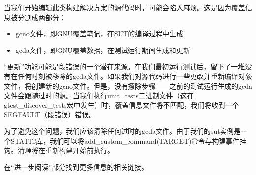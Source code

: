 当我们开始编辑此类构建解决方案的源代码时，可能会陷入麻烦。这是因为覆盖信息被分割成两部分：

\begin{itemize}
\item
gcno文件，即GNU覆盖笔记，在SUT的编译过程中生成

\item
gcda文件，即GNU覆盖数据，在测试运行期间生成和更新
\end{itemize}

“更新”功能可能是段错误的一个潜在来源。在我们最初运行测试后，留下了一堆没有在任何时刻被移除的gcda文件。如果我们对源代码进行一些更改并重新编译对象文件，将创建新的gcno文件。但是，没有擦除步骤——之前的测试运行生成的gcda文件会跟随过时的源。当我们执行unit\_tests二进制文件（这在gtest\_discover\_tests宏中发生）时，覆盖信息文件将不匹配，我们将收到一个SEGFAULT（段错误）错误。

为了避免这个问题，我们应该清除任何过时的gcda文件。由于我们的sut实例是一个STATIC库，我们可以将add\_custom\_command(TARGET)命令与构建事件挂钩。清理将在重新构建开始前执行。

在“进一步阅读”部分找到更多信息的相关链接。




